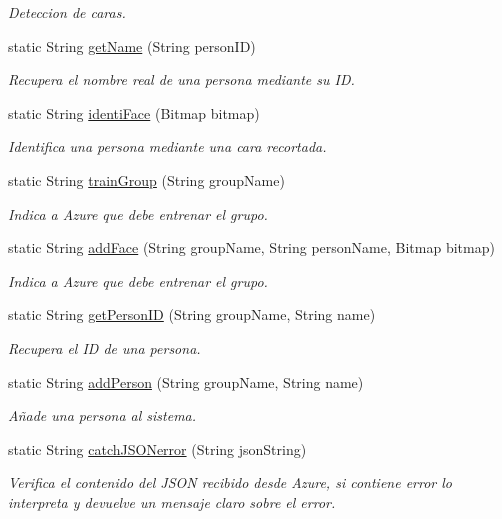 \begin{DoxyCompactItemize}
\begin{DoxyCompactList}\small\item\em Deteccion de caras. \end{DoxyCompactList}\item 
static String \mbox{\hyperlink{classcom_1_1loalon_1_1pfg_1_1facepal_1_1_util_ac1062b1f3ee41b64274d734556cac898}{get\+Name}} (String person\+ID)
\begin{DoxyCompactList}\small\item\em Recupera el nombre real de una persona mediante su ID. \end{DoxyCompactList}\item 
static String \mbox{\hyperlink{classcom_1_1loalon_1_1pfg_1_1facepal_1_1_util_acedba139e29bc531032abf79980128d2}{identi\+Face}} (Bitmap bitmap)
\begin{DoxyCompactList}\small\item\em Identifica una persona mediante una cara recortada. \end{DoxyCompactList}\item 
static String \mbox{\hyperlink{classcom_1_1loalon_1_1pfg_1_1facepal_1_1_util_a59c6bb634708c5835281c91ead1b80bf}{train\+Group}} (String group\+Name)
\begin{DoxyCompactList}\small\item\em Indica a Azure que debe entrenar el grupo. \end{DoxyCompactList}\item 
static String \mbox{\hyperlink{classcom_1_1loalon_1_1pfg_1_1facepal_1_1_util_a94d73c1994c5e91f40cdf579e0aa7418}{add\+Face}} (String group\+Name, String person\+Name, Bitmap bitmap)
\begin{DoxyCompactList}\small\item\em Indica a Azure que debe entrenar el grupo. \end{DoxyCompactList}\item 
static String \mbox{\hyperlink{classcom_1_1loalon_1_1pfg_1_1facepal_1_1_util_ab74c33dc6a4bab04e396bce32b5dd62e}{get\+Person\+ID}} (String group\+Name, String name)
\begin{DoxyCompactList}\small\item\em Recupera el ID de una persona. \end{DoxyCompactList}\item 
static String \mbox{\hyperlink{classcom_1_1loalon_1_1pfg_1_1facepal_1_1_util_ac5f20400dac2f1de327eebbc22a26550}{add\+Person}} (String group\+Name, String name)
\begin{DoxyCompactList}\small\item\em Añade una persona al sistema. \end{DoxyCompactList}\item 
static String \mbox{\hyperlink{classcom_1_1loalon_1_1pfg_1_1facepal_1_1_util_aa4018f950fbd192cfd731e7ec401ea9e}{catch\+J\+S\+O\+Nerror}} (String json\+String)
\begin{DoxyCompactList}\small\item\em Verifica el contenido del J\+S\+ON recibido desde Azure, si contiene error lo interpreta y devuelve un mensaje claro sobre el error. \end{DoxyCompactList}\end{DoxyCompactItemize}
